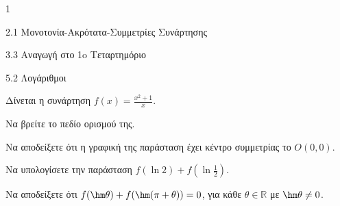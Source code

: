 \begin{ylh}{1}
\item 2.1 Μονοτονία-Ακρότατα-Συμμετρίες Συνάρτησης
\item 3.3 Αναγωγή στο 1o Τεταρτημόριο
\item 5.2 Λογάριθμοι
\end{ylh}
Δίνεται η συνάρτηση $f(x) = \frac{x^2 + 1}{x}$.
\begin{alist}
\item Να βρείτε το πεδίο ορισμού της.
\item Να αποδείξετε ότι η γραφική της παράσταση έχει κέντρο συμμετρίας το $O(0,0)$.
\item Να υπολογίσετε την παράσταση $f(\ln 2) + f\left(\ln \frac{1}{2}\right)$.
\item Να αποδείξετε ότι $f(\hm \theta) + f(\hm (\pi + \theta)) = 0$, για κάθε $\theta \in \mathbb{R}$ με $\hm \theta \neq 0$.
\end{alist}

